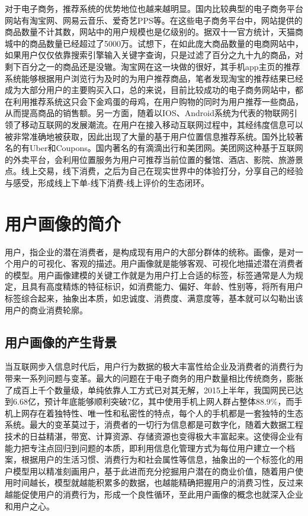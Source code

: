 	对于电子商务，推荐系统的优势地位也越来越明显。国内比较典型的电子商务平台网站有淘宝网、网易云音乐、爱奇艺PPS等。在这些电子商务平台中，网站提供的商品数量不计其数，网站中的用户规模也是亿级别的。据双十一官方统计，天猫商城中的商品数量已经超过了5000万。试想下，在如此庞大商品数量的电商网站中，如果用户仅仅依靠搜索引擎输入关键字查询，只是过滤了百分之九十九的商品，对剩下百分之一的商品还是没辙。淘宝网在这一块做的很好，其手机app主页的推荐系统能够根据用户浏览行为\citep{user-interest}及时的为用户推荐商品，笔者发现淘宝的推荐结果已经成为大部分用户的主要购买入口，总的来说，目前比较成功的电子商务网站中，都在利用推荐系统这只会下金鸡蛋的母鸡，在用户购物的同时为用户推荐一些商品，从而提高商品的销售额。另一方面，随着以IOS、Android系统为代表的物联网引领了移动互联网的发展潮流。在用户在接入移动互联网过程中，其经纬度信息可以被非常准确地被获取，因此出现了大量的基于用户位置信息推荐系统。国外比较著名的有Uber和Coupons。国内著名的有滴滴出行和美团网。美团网这种基于互联网的外卖平台，会利用位置服务为用户可推荐当前位置的餐馆、酒店、影院、旅游景点。线上交易，线下消费，之后为自己在现实世界中的体验打分，分享自己的经验与感受，形成线上下单-线下消费-线上评价的生态闭环。

	

\section{用户画像的简介}
	用户，指企业的潜在消费者，是构成现有用户的大部分群体的统称。画像，是对一个用户的可视化、客观的描述。用户画像就是能够客观、可视化地描述潜在消费者的模型。用户画像建模的关键工作就是为用户打上合适的标签，标签通常是人为规定，且具有高度精炼的特征标识，如消费能力、偏好、年龄、性别等，将所有用户标签综合起来，抽象出本质，如忠诚度、消费度、满意度等，基本就可以勾勒出该用户的商业消费轮廓。
	\subsection{用户画像的产生背景}
	当互联网步入信息时代后，用户行为数据的极大丰富性给企业及消费者的消费行为带来一系列问题与变革。最大的问题在于电子商务的用户数量相比传统商务，膨胀了成百上千个数量级，单纯依靠人工方式已对其无解，2015上半年，我国网民已达到6.68亿，预计年底能够顺利突破7亿，其中使用手机上网人群占整体88.9\%，而手机上网存在着独特性、唯一性和私密性的特点，每个人的手机都是一套独特的生态系统。最大的变革莫过于，消费者的一切行为信息都是可数字化，随着大数据工程技术的日益精湛，带宽、计算资源、存储资源也变得极大丰富起来。这使得企业有能力把专注点回归到问题的本质，即利用信息化管理方式为每位用户建立一个档案，根据用户的生活习惯、消费行为和社会属性等信息，抽象出的一个标签化的用户模型用以精准刻画用户，基于此进而充分挖掘用户潜在的商业价值，随着用户使用时间越长，模型就越能积累多的数据，也越能精确把握用户的消费习性，反过来越能促使用户的消费行为，形成一个良性循环，至此用户画像的概念也就深入企业和用户之心。

